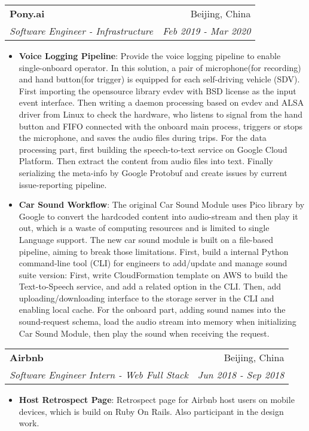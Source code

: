 \documentclass[letterpaper,11pt]{article}
\makeatletter
\newcommand{\resumeItem}[2]{
	\item\small{
		\textbf{#1}{: #2 \vspace{-2pt}}
	}
}
\newcommand{\resumeSubheading}[4]{
	\vspace{-1pt}\item
	\begin{tabular*}{0.97\textwidth}[t]{l@{\extracolsep{\fill}}r}
		\textbf{#1} & #2 \\
		\textit{\small#3} & \textit{\small #4} \\
	\end{tabular*}\vspace{-5pt}
}
\newcommand{\resumeSubSubheading}[2]{
	\begin{tabular*}{0.97\textwidth}{l@{\extracolsep{\fill}}r}
		\textit{\small#1} & \textit{\small #2} \\
	\end{tabular*}\vspace{-5pt}
}
\newcommand{\resumeSubHeadingListEnd}{\end{itemize}}
\newcommand{\resumeItemListStart}{\begin{itemize}}
\newcommand{\resumeItemListEnd}{\end{itemize}\vspace{-5pt}}
\makeatother
\begin{document}
\begin{spacing}{0.80}
	\resumeSubheading
	{Pony.ai}{Beijing, China}
	{Software Engineer - Infrastructure}{Feb 2019 - Mar 2020}
	\resumeItemListStart
	\resumeItem{Voice Logging Pipeline}
	{Provide the voice logging pipeline to enable single-onboard operator. In this solution, a pair of microphone(for recording) and hand button(for trigger) is equipped for each self-driving vehicle (SDV). First importing the opensource library evdev with BSD license as the input event interface. Then writing a daemon processing based on evdev and ALSA driver from Linux to check the hardware, who listens to signal from the hand button and FIFO connected with the onboard main process, triggers or stops the microphone, and saves the audio files during trips. For the data processing part, first building the speech-to-text service on Google Cloud Platform. Then extract the content from audio files into text. Finally serializing the meta-info by Google Protobuf and create issues by current issue-reporting pipeline.}
	\resumeItem{Car Sound Workflow}
	{The original Car Sound Module uses Pico library by Google to convert the hardcoded content into audio-stream and then play it out, which is a waste of computing resources and is limited to single Language support. The new car sound module is built on a file-based pipeline, aiming to break those limitations. First, build a internal Python command-line tool (CLI) for engineers to add/update and manage sound suite version: First, write CloudFormation template on AWS to build the Text-to-Speech service, and add a related option in the CLI. Then, add uploading/downloading interface to the storage server in the CLI and enabling local cache. For the onboard part, adding sound names into the sound-request schema, load the audio stream into memory when initializing Car Sound Module, then play the sound when receiving the request.}
	\resumeItemListEnd

	
	
	
	\resumeSubheading
	{Airbnb}{Beijing, China}
	{Software Engineer Intern - Web Full Stack}{Jun 2018 - Sep 2018}
	\resumeItemListStart
	\resumeItem{Host Retrospect Page}
	{Retrospect page for Airbnb host users on mobile devices, which is build on Ruby On Rails. Also participant in the design work.}
	\resumeItemListEnd
	

\end{spacing}
\end{document}
